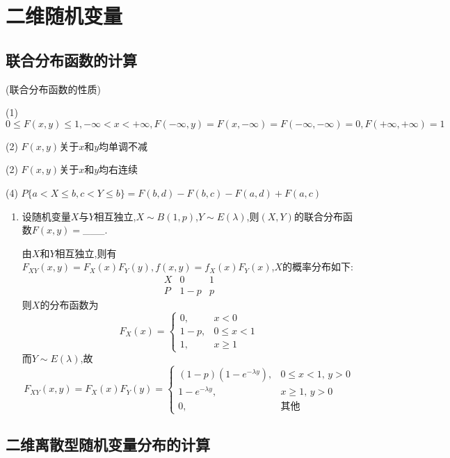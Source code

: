 \documentclass[12pt, a4paper, oneside, UTF8]{ctexbook}
\begin{document}
% 
\else
\fi
\chapter{二维随机变量}

\section{联合分布函数的计算}
\begin{remark}
    (联合分布函数的性质)
    \item[(1)] $0\leq F(x,y)\leq 1,-\infty<x<+\infty, F(-\infty,y)=F(x,-\infty)=F(-\infty,-\infty)=0,F(+\infty,+\infty)=1$
    \item[(2)] $F(x,y)$关于$x$和$y$均单调不减
    \item[(2)] $F(x,y)$关于$x$和$y$均右连续
    \item[(4)] $P\{a<X\leq b,c<Y\leq b\}=F(b,d)-F(b,c)-F(a,d)+F(a,c)$  
\end{remark}

\begin{enumerate}[label=\arabic*.]
    \item 设随机变量$X$与$Y$相互独立,$X\sim B(1,p)$,$Y\sim E(\lambda)$,则$(X,Y)$的联合分布函数$F(x,y)=$\_\_\_.
    
    \begin{solution}
    由$X$和$Y$相互独立,则有$F_{XY}(x,y)=F_{X}(x)F_{Y}(y),f(x,y)=f_{X}(x)F_{Y}(x)$,$X$的概率分布如下:
    \[
    \begin{array}{c|c|c}
        X&0&1\\
        \hline
        P&1-p&p
    \end{array}
    \]
    则$X$的分布函数为
    \[F_{X}(x)=
    \begin{cases}
        0, & x < 0\\
        1-p, & 0\leq x < 1\\
        1, &x\geq 1
    \end{cases}
    \]
    而$Y\sim E(\lambda)$,故
    \[
    F_{XY}(x,y)=F_{X}(x)F_{Y}(y)=\begin{cases}
        (1-p)(1-e^{-\lambda y}), & 0\leq x < 1,\, y > 0 \\
        1-e^{-\lambda y}, & x\geq 1,\, y > 0\\
        0, & \text{其他}
    \end{cases}
    \]
    \end{solution}
\end{enumerate}

\section{二维离散型随机变量分布的计算}
\end{document}
